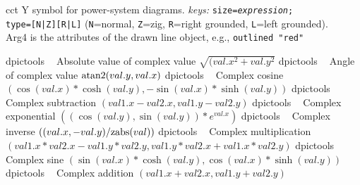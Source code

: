 %

%
  {cct}%
  {Y symbol for power-system diagrams.
   {\sl keys:} {\tt size={\sl expression};\\
   type={\tt [N|Z][R|L]}} ({\tt N}=normal, {\tt Z}=zig, {\tt R}=right grounded,
    {\tt L}=left grounded).\\
   Arg4 is the attributes of the drawn line object,
   e.g., {\tt outlined "red"}}%

%

%
  {dpictools}%
  {$\;\;$ Absolute value of complex value $\sqrt{(val.x^2+val.y^2}$}%
%
  {dpictools}%
  {$\;\;$ Angle of complex value $\hbox{atan2}(val.y, val.x)$}%
%
  {dpictools}%
  {$\;\;$ Complex cosine
    $(\cos(val.x)*\cosh(val.y), -\sin(val.x)*\sinh(val.y))$}%
%
  {dpictools}%
  {$\;\;$ Complex subtraction $(val1.x-val2.x, val1.y-val2.y)$}%
%
  {dpictools}%
  {$\;\;$ Complex exponential $((\cos(val.y), \sin(val.y))*e^{val.x})$}%
%
  {dpictools}%
  {$\;\;$ Complex inverse $((val.x, -val.y)/\hbox{zabs}(val))$}%
%
  {dpictools}%
  {$\;\;$ Complex multiplication
   $(val1.x*val2.x-val1.y*val2.y, val1.y*val2.x+val1.x*val2.y)$}%
%
  {dpictools}%
  {$\;\;$ Complex sine
   $(\sin(val.x)*\cosh(val.y), \cos(val.x)*\sinh(val.y))$}%
%
  {dpictools}%
  {$\;\;$ Complex addition $(val1.x+val2.x, val1.y+val2.y)$}%

